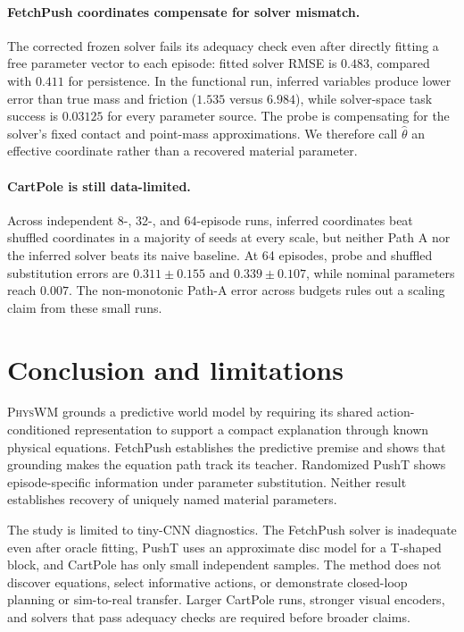 \documentclass{article}
\newcommand{\model}{\textsc{PhysWM}\xspace}
\begin{document}
\paragraph{FetchPush coordinates compensate for solver mismatch.} The corrected frozen solver fails its adequacy check even after directly fitting a free parameter vector to each episode: fitted solver RMSE is $0.483$, compared with $0.411$ for persistence. In the functional run, inferred variables produce lower error than true mass and friction ($1.535$ versus $6.984$), while solver-space task success is $0.03125$ for every parameter source. The probe is compensating for the solver's fixed contact and point-mass approximations. We therefore call $\hat\theta$ an effective coordinate rather than a recovered material parameter.

\paragraph{CartPole is still data-limited.} Across independent 8-, 32-, and 64-episode runs, inferred coordinates beat shuffled coordinates in a majority of seeds at every scale, but neither Path A nor the inferred solver beats its naive baseline. At 64 episodes, probe and shuffled substitution errors are $0.311\pm0.155$ and $0.339\pm0.107$, while nominal parameters reach $0.007$. The non-monotonic Path-A error across budgets rules out a scaling claim from these small runs.

\section{Conclusion and limitations}

\model grounds a predictive world model by requiring its shared action-conditioned representation to support a compact explanation through known physical equations. FetchPush establishes the predictive premise and shows that grounding makes the equation path track its teacher. Randomized PushT shows episode-specific information under parameter substitution. Neither result establishes recovery of uniquely named material parameters.

The study is limited to tiny-CNN diagnostics. The FetchPush solver is inadequate even after oracle fitting, PushT uses an approximate disc model for a T-shaped block, and CartPole has only small independent samples. The method does not discover equations, select informative actions, or demonstrate closed-loop planning or sim-to-real transfer. Larger CartPole runs, stronger visual encoders, and solvers that pass adequacy checks are required before broader claims.



\end{document}
